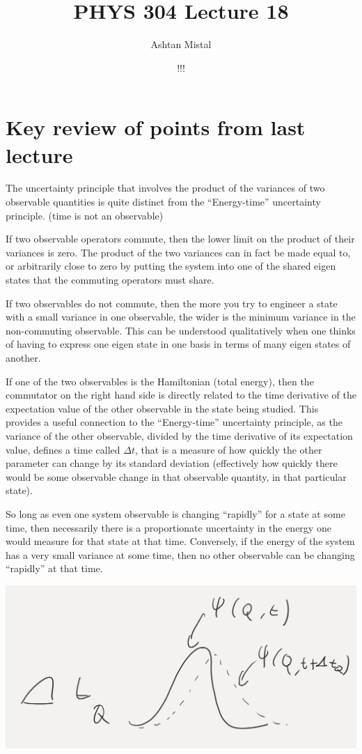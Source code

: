 \documentclass{article}
\title{PHYS 304 Lecture 18}
\author{Ashtan Mistal}
\date{!!!}
\begin{document}
\ifstandalone
\maketitle
\fi

\graphicspath{{./Lecture18!/}}

\section{Key review of points from last lecture}

The uncertainty principle that involves the product of the variances of two observable quantities is quite distinct from the “Energy-time” uncertainty principle.  (time is not an observable)

If two observable operators commute, then the lower limit on the product of their variances is zero.  The product of the two variances can in fact be made equal to, or arbitrarily close to zero by putting the system into one of the shared eigen states that the commuting operators must share.

If two observables do not commute, then the more you try to engineer a state with a small variance in one observable, the wider is the minimum variance in the non-commuting observable.  This can be understood qualitatively when one thinks of having to express one eigen state in one basis in terms of many eigen states of another.

If one of the two observables is the Hamiltonian (total energy), then the commutator on the right hand side is directly related to the time derivative of the expectation value of the other observable in the state being studied.  This provides a useful connection to the “Energy-time” uncertainty principle, as the variance of the other observable, divided by the time derivative of its expectation value, defines a time called $\Delta t$, that is a measure of how quickly the other parameter can change by its standard deviation (effectively how quickly there would be some observable change in that observable quantity, in that particular state).  

So long as even one system observable is changing “rapidly” for a state at some time, then necessarily there is a proportionate uncertainty in the energy one would measure for that state at that time.  Conversely, if the energy of the system has a very small variance at some time, then no other observable can be changing “rapidly” at that time.

\includegraphics[width = 0.6 \textwidth]{Lecture18/1.png}
\end{document}
